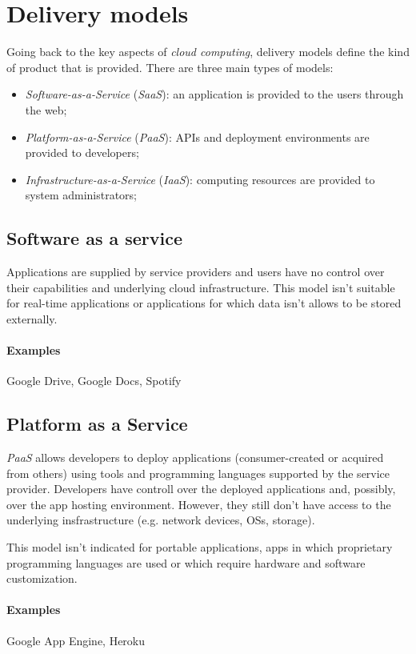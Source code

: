 \section{Delivery models}
Going back to the key aspects of \emph{cloud computing}, delivery models define
the kind of product that is provided. There are three main types of models:
\begin{itemize}
    \item \emph{Software-as-a-Service} (\emph{SaaS}): an application is provided
    to the users through the web;
    \item \emph{Platform-as-a-Service} (\emph{PaaS}): APIs and deployment
    environments are provided to developers;
    \item \emph{Infrastructure-as-a-Service} (\emph{IaaS}): computing resources
    are provided to system administrators;
\end{itemize}

\subsection{Software as a service}
Applications are supplied by service providers and users have no control over their
capabilities and underlying cloud infrastructure. This model isn't suitable for
real-time applications or applications for which data isn't allows to be stored
externally.

\paragraph{Examples} Google Drive, Google Docs, Spotify

\subsection{Platform as a Service}
\emph{PaaS} allows developers to deploy applications (consumer-created or acquired
from others) using tools and programming languages supported by the service
provider. Developers have controll over the deployed applications and, possibly,
over the app hosting environment. However, they still don't have access to the
underlying insfrastructure (e.g. network devices, OSs, storage).


This model isn't indicated for portable applications, apps in which proprietary
programming languages are used or which require hardware and software customization.

\paragraph{Examples} Google App Engine, Heroku

